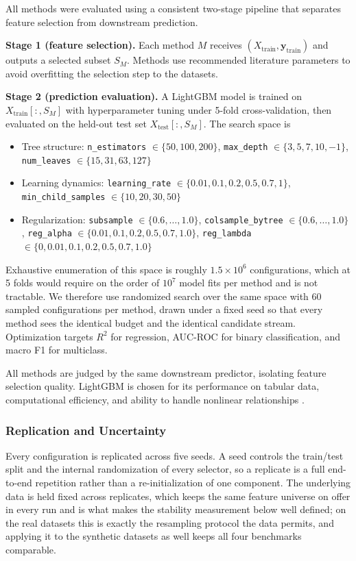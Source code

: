 \documentclass[11pt]{article}
\begin{document}
All methods were evaluated using a consistent two-stage pipeline that separates feature selection
from downstream prediction.

\textbf{Stage 1 (feature selection).} Each method $M$ receives $(X_{\mathrm{train}},
\mathbf{y}_{\mathrm{train}})$ and outputs a selected subset $S_M$. Methods use recommended literature
parameters to avoid overfitting the selection step to the datasets.

\textbf{Stage 2 (prediction evaluation).} A LightGBM model is trained on
$X_{\mathrm{train}}[:, S_M]$ with hyperparameter tuning under 5-fold cross-validation, then evaluated
on the held-out test set $X_{\mathrm{test}}[:, S_M]$. The search space is
\begin{itemize}
\item Tree structure: \texttt{n\_estimators} $\in \{50, 100, 200\}$, \texttt{max\_depth} $\in
\{3, 5, 7, 10, -1\}$, \texttt{num\_leaves} $\in \{15, 31, 63, 127\}$
\item Learning dynamics: \texttt{learning\_rate} $\in \{0.01, 0.1, 0.2, 0.5, 0.7, 1\}$,
\texttt{min\_child\_samples} $\in \{10, 20, 30, 50\}$
\item Regularization: \texttt{subsample} $\in \{0.6, \dots, 1.0\}$, \texttt{colsample\_bytree} $\in
\{0.6, \dots, 1.0\}$, \texttt{reg\_alpha} $\in \{0.01, 0.1, 0.2, 0.5, 0.7, 1.0\}$,
\texttt{reg\_lambda} $\in \{0, 0.01, 0.1, 0.2, 0.5, 0.7, 1.0\}$
\end{itemize}
Exhaustive enumeration of this space is roughly $1.5 \times 10^{6}$ configurations, which at 5 folds
would require on the order of $10^{7}$ model fits per method and is not tractable. We therefore use
randomized search over the same space with 60 sampled configurations per method, drawn under a fixed
seed so that every method sees the identical budget and the identical candidate stream. Optimization
targets $R^2$ for regression, AUC-ROC for binary classification, and macro F1 for multiclass.

All methods are judged by the same downstream predictor, isolating feature selection quality.
LightGBM is chosen for its performance on tabular data, computational efficiency, and ability to
handle nonlinear relationships \citep{ke2017}.

\subsubsection{Replication and Uncertainty}
\label{sec:replication}

Every configuration is replicated across five seeds. A seed controls the
train/test split and the internal randomization of every selector, so a
replicate is a full end-to-end repetition rather than a re-initialization of one
component. The underlying data is held fixed across replicates, which keeps the
same feature universe on offer in every run and is what makes the stability
measurement below well defined; on the real datasets this is exactly the
resampling protocol the data permits, and applying it to the synthetic datasets
as well keeps all four benchmarks comparable.
\end{document}
